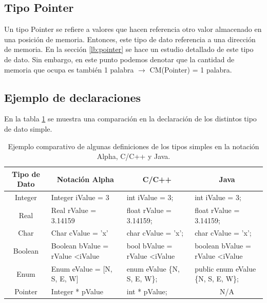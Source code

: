 \subsection{Tipo Pointer}

Un tipo Pointer se refiere a valores que hacen referencia otro valor almacenado en una posición de memoria. Entonces, este tipo de dato referencia a una dirección de memoria. En la sección \ref{lb:pointer} se hace un estudio detallado de este tipo de dato. Sin embargo, en este punto podemos denotar que la cantidad de memoria que ocupa es también 1 palabra $\rightarrow$ CM(Pointer) = 1 palabra.

\subsection{Ejemplo de declaraciones}

En la tabla \ref{tab:tipodata} se muestra una comparación en la declaración de los distintos tipo de dato simple.

\begin{center}
\begin{table}[h]
\centering
\begin{tabular}{clll}
\hline
Tipo de Dato & \multicolumn{1}{c}{Notación Alpha}       & \multicolumn{1}{c}{C/C++}             & \multicolumn{1}{c}{Java}                 \\ \hline
Integer      & Integer iValue = 3                       & int iValue = 3;                       & int iValue = 3;                          \\
Real         & Real rValue = 3.14159                    & float rValue = 3.14159;               & float rValue = 3.14159;                  \\
Char         & Char cValue = 'x'                        & char cValue = 'x';                    & char cValue = 'x';                       \\
Boolean      & Boolean bValue = rValue \textless iValue & bool bValue = rValue \textless iValue & boolean bValue = rValue \textless iValue \\
Enum         & Enum eValue = {[}N, S, E, W{]}           & enum eValue \{N, S, E, W\};           & public enum eValue \{N, S, E, W\};       \\
Pointer      & Integer * pValue                         & int * pValue;                         & \multicolumn{1}{c}{N/A}                  \\ \hline
\end{tabular}
\caption{Ejemplo comparativo de algunas definiciones de los tipos simples en la notación Alpha, C/C++ y Java.}
\label{tab:tipodata}
\end{table}
\end{center}

